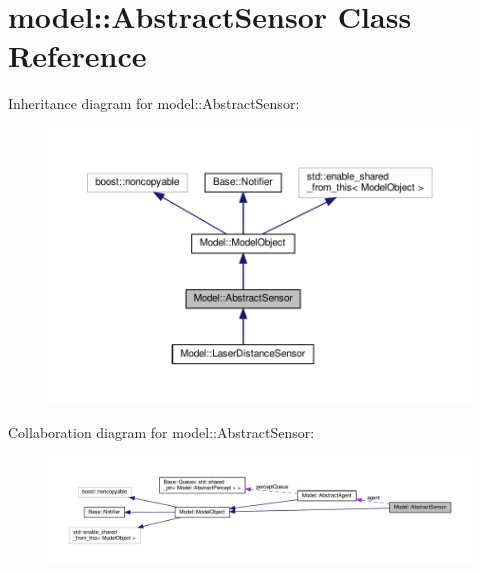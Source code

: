 \hypertarget{class_model_1_1_abstract_sensor}{}\section{model\+:\+:Abstract\+Sensor Class Reference}
\label{class_model_1_1_abstract_sensor}


Inheritance diagram for model\+:\+:Abstract\+Sensor\+:
\nopagebreak
\begin{figure}[H]
\begin{center}
\leavevmode
\includegraphics[width=350pt]{class_model_1_1_abstract_sensor__inherit__graph}
\end{center}
\end{figure}


Collaboration diagram for model\+:\+:Abstract\+Sensor\+:
\nopagebreak
\begin{figure}[H]
\begin{center}
\leavevmode
\includegraphics[width=350pt]{class_model_1_1_abstract_sensor__coll__graph}
\end{center}
\end{figure}
